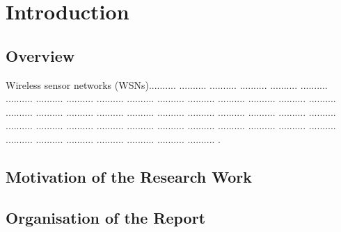 \chapter{Introduction}\label{chap1}

\section{Overview}
Wireless sensor networks (WSNs).......... .......... .......... .......... .......... .......... .......... .......... .......... .......... .......... .......... .......... .......... .......... .......... .......... .......... .......... .......... .......... .......... .......... .......... .......... .......... .......... .......... .......... .......... .......... .......... .......... .......... .......... .......... .......... .......... .......... .......... .......... .......... .......... .......... .......... .......... . 

\section{Motivation of the Research Work}\label{sec1.1}


\section{Organisation of the Report}\label{sec1.3}